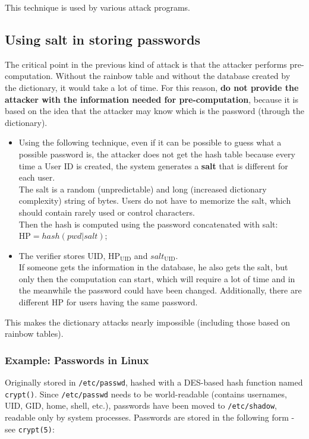 This technique is used by various attack programs.


\subsection{Using salt in storing passwords}
The critical point in the previous kind of attack is that the attacker performs pre-computation. Without the rainbow
table and without the database created by the dictionary,
it would take a lot of time. For this reason, \textbf{do not provide the attacker with the information needed for pre-computation},
because it is based on the idea that the attacker may know which is the password (through the dictionary).

\begin{itemize}
  \item Using the following technique, even if it can be possible to guess what a possible password is, the attacker
        does not get the hash table because every time a User ID is created, the system generates a \textbf{salt} that is different for each user.\\
        The salt is a random (unpredictable) and long (increased dictionary complexity) string of bytes.
        Users do not have to memorize the salt, which should contain rarely used or control characters.\\
        Then the hash is computed using the password concatenated with salt:\\
        $\mathrm{HP} = hash(pwd | salt)$;
  \item The verifier stores UID,
        $\mathrm{HP}_{\mathrm{UID}}$ and $salt_{\mathrm{UID}}$.\\
        If someone gets the information in the database, he also gets the salt, but only then the
        computation can start, which will require a lot of time and in the meanwhile the password could have been
        changed. Additionally, there are different HP for users having the same password.
\end{itemize}

This makes the dictionary attacks nearly impossible (including those based on rainbow tables).


\subsubsection{Example: Passwords in Linux}
Originally stored in \texttt{/etc/passwd}, hashed with a DES-based
hash function named \texttt{crypt()}.
Since \texttt{/etc/passwd} needs to be world-readable (contains
usernames, UID, GID, home, shell, etc.), passwords have been
moved to \texttt{/etc/shadow}, readable only by system processes.
Passwords are stored in the following form - see \texttt{crypt(5)}:


